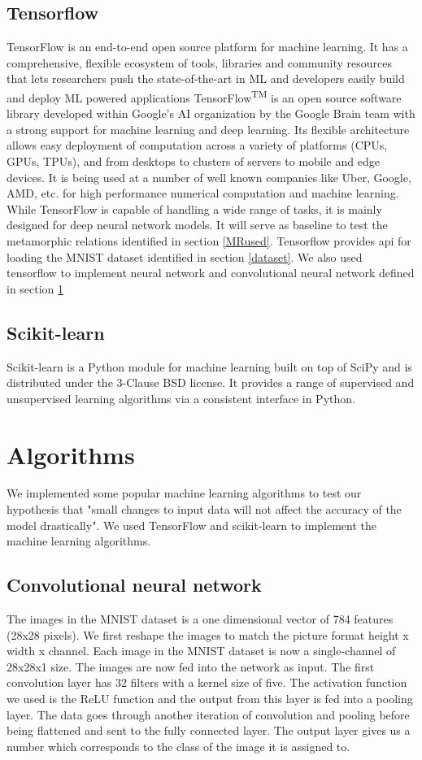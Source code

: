 \subsection{Tensorflow}
TensorFlow is an end-to-end open source platform for machine learning. It has a comprehensive, flexible ecosystem of tools, libraries and community resources that lets researchers push the state-of-the-art in ML and developers easily build and deploy ML powered applications
TensorFlow\textsuperscript{TM} is an open source software library developed within Google’s AI organization by the Google Brain team with a strong support for machine learning and deep learning. Its flexible architecture allows easy deployment of computation across a variety of platforms (CPUs, GPUs, TPUs), and from desktops to clusters of servers to mobile and edge devices. It is being used at a number of well known companies like Uber, Google, AMD, etc. for high performance numerical computation and machine learning. While TensorFlow is capable of handling a wide range of tasks, it is mainly designed for deep neural network models. It will serve as baseline to test the metamorphic relations identified in section \ref{MRused}. Tensorflow provides api for loading the MNIST dataset identified in section \ref{dataset}. We also used tensorflow to implement neural network and convolutional neural network defined in section \ref{Algorithms}

\subsection{Scikit-learn}
Scikit-learn is a Python module for machine learning built on top of SciPy and is distributed under the 3-Clause BSD license.
It provides a range of supervised and unsupervised learning algorithms via a consistent interface in Python.


\section{Algorithms}\label{Algorithms}
We implemented some popular machine learning algorithms to test our hypothesis that "small changes to input data will not affect the accuracy of the model drastically". We used TensorFlow and scikit-learn to implement the machine learning algorithms. 
\subsection{Convolutional neural network}
The images in the MNIST dataset is a one dimensional vector of 784 features (28x28 pixels). We first reshape the images to match the picture format height x width x channel. Each image in the MNIST dataset is now a single-channel of 28x28x1 size. The images are now fed into the network as input. The first convolution layer has 32 filters with a kernel size of five. The activation function we used is the ReLU function and the output from this layer is fed into a pooling layer. The data goes through another iteration of convolution and pooling before being flattened and sent to the fully connected layer. The output layer gives us a number which corresponds to the class of the image it is assigned to.

